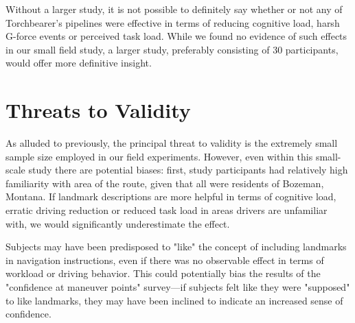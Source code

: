 Without a larger study, it is not possible to definitely say whether or not any of Torchbearer's pipelines were effective in terms of reducing cognitive load, harsh G-force events or perceived task load. While we found no evidence of such effects in our small field study, a larger study, preferably consisting of 30 participants, would offer more definitive insight.

\section{Threats to Validity}

As alluded to previously, the principal threat to validity is the extremely small sample size employed in our field experiments. However, even within this small-scale study there are potential biases: first, study participants had relatively high familiarity with area of the route, given that all were residents of Bozeman, Montana. If landmark descriptions are more helpful in terms of cognitive load, erratic driving reduction or reduced task load in areas drivers are unfamiliar with, we would significantly underestimate the effect.

Subjects may have been predisposed to "like" the concept of including landmarks in navigation instructions, even if there was no observable effect in terms of workload or driving behavior. This could potentially bias the results of the "confidence at maneuver points" survey---if subjects felt like they were "supposed" to like landmarks, they may have been inclined to indicate an increased sense of confidence.